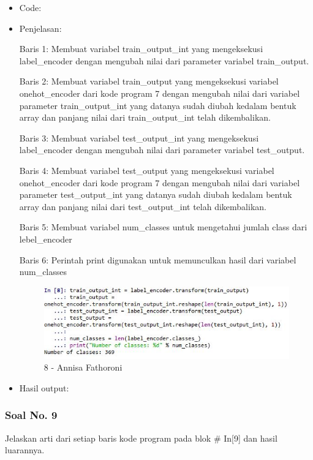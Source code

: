 \begin{itemize}
\item Code:


\item Penjelasan:

Baris 1: Membuat variabel train\_output\_int yang mengeksekusi label\_encoder dengan mengubah nilai dari parameter variabel train\_output.

Baris 2: Membuat variabel train\_output yang mengeksekusi variabel onehot\_encoder dari kode program 7 dengan mengubah nilai dari variabel parameter train\_output\_int yang datanya sudah diubah kedalam bentuk array dan panjang nilai dari train\_output\_int telah dikembalikan.

Baris 3: Membuat variabel test\_output\_int yang mengeksekusi label\_encoder dengan mengubah nilai dari parameter variabel test\_output.

Baris 4: Membuat variabel test\_output yang mengeksekusi variabel onehot\_encoder dari kode program 7 dengan mengubah nilai dari variabel parameter test\_output\_int yang datanya sudah diubah kedalam bentuk array dan panjang nilai dari test\_output\_int telah dikembalikan.

Baris 5: Membuat variabel num\_classes untuk mengetahui jumlah class dari lebel\_encoder

Baris 6: Perintah print digunakan untuk memunculkan hasil dari variabel num\_classes

\begin{figure}[!hbtp]
\centering
\includegraphics[scale=0.7]{figures/Chapter 7/1164067/Praktek/Chapter7AnnisaFathoroni8.jpg}
\caption{8 - Annisa Fathoroni}
\label{8 - Annisa Fathoroni}
\end{figure}

\item Hasil output:

\end{itemize}

\subsubsection{Soal No. 9}
Jelaskan arti dari setiap baris kode program pada blok \# In[9] dan hasil luarannya.

